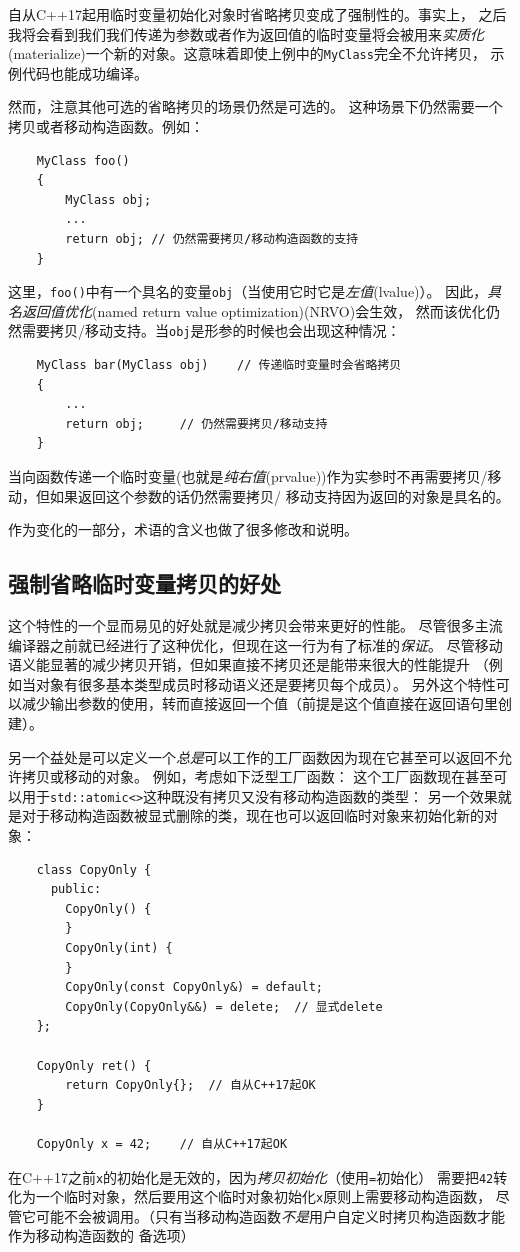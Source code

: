 自从C++17起用临时变量初始化对象时省略拷贝变成了强制性的。事实上，
之后我将会看到我们我们传递为参数或者作为返回值的临时变量将会被用来\emph{实质化}
(materialize)一个新的对象。这意味着即使上例中的\texttt{MyClass}完全不允许拷贝，
示例代码也能成功编译。

然而，注意其他可选的省略拷贝的场景仍然是可选的。
这种场景下仍然需要一个拷贝或者移动构造函数。例如：
\begin{lstlisting}
    MyClass foo()
    {
        MyClass obj;
        ...
        return obj; // 仍然需要拷贝/移动构造函数的支持
    }
\end{lstlisting}
这里，\texttt{foo()}中有一个具名的变量\texttt{obj}（当使用它时它是\emph{左值}(lvalue)）。
因此，\emph{具名返回值优化}(named return value optimization)(NRVO)会生效，
然而该优化仍然需要拷贝/移动支持。当\texttt{obj}是形参的时候也会出现这种情况：
\begin{lstlisting}
    MyClass bar(MyClass obj)    // 传递临时变量时会省略拷贝
    {
        ...
        return obj;     // 仍然需要拷贝/移动支持
    }
\end{lstlisting}
当向函数传递一个临时变量(也就是\emph{纯右值}(prvalue))作为实参时不再需要拷贝/移动，但如果返回这个参数的话仍然需要拷贝/
移动支持因为返回的对象是具名的。

作为变化的一部分，术语的含义也做了很多修改和说明。

\subsection{强制省略临时变量拷贝的好处}
这个特性的一个显而易见的好处就是减少拷贝会带来更好的性能。
尽管很多主流编译器之前就已经进行了这种优化，但现在这一行为有了标准的\emph{保证}。
尽管移动语义能显著的减少拷贝开销，但如果直接不拷贝还是能带来很大的性能提升
（例如当对象有很多基本类型成员时移动语义还是要拷贝每个成员）。
另外这个特性可以减少输出参数的使用，转而直接返回一个值（前提是这个值直接在返回语句里创建）。

另一个益处是可以定义一个\emph{总是}可以工作的工厂函数因为现在它甚至可以返回不允许拷贝或移动的对象。
例如，考虑如下泛型工厂函数：
这个工厂函数现在甚至可以用于\texttt{std::atomic<>}这种既没有拷贝又没有移动构造函数的类型：
另一个效果就是对于移动构造函数被显式删除的类，现在也可以返回临时对象来初始化新的对象：
\begin{lstlisting}
    class CopyOnly {
      public:
        CopyOnly() {
        }
        CopyOnly(int) {
        }
        CopyOnly(const CopyOnly&) = default;
        CopyOnly(CopyOnly&&) = delete;  // 显式delete
    };

    CopyOnly ret() {
        return CopyOnly{};  // 自从C++17起OK
    }

    CopyOnly x = 42;    // 自从C++17起OK
\end{lstlisting}
在C++17之前\texttt{x}的初始化是无效的，因为\emph{拷贝初始化}（使用\texttt{=}初始化）
需要把\texttt{42}转化为一个临时对象，然后要用这个临时对象初始化\texttt{x}原则上需要移动构造函数，
尽管它可能不会被调用。（只有当移动构造函数\emph{不是}用户自定义时拷贝构造函数才能作为移动构造函数的
备选项）

